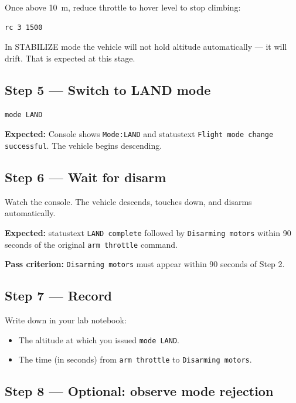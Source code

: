 \documentclass[a4paper,11pt,twoside]{article}
\begin{document}
Once above 10~m, reduce throttle to hover level to stop climbing:

\begin{Verbatim}[frame=single,fontsize=\small]
rc 3 1500
\end{Verbatim}

In STABILIZE mode the vehicle will not hold altitude automatically --- it will drift. That is expected at this stage.

\subsection*{Step 5 --- Switch to LAND mode}

\begin{Verbatim}[frame=single,fontsize=\small]
mode LAND
\end{Verbatim}

\textbf{Expected:} Console shows \texttt{Mode:LAND} and statustext \texttt{Flight mode change successful}. The vehicle begins descending.

\subsection*{Step 6 --- Wait for disarm}

Watch the console. The vehicle descends, touches down, and disarms automatically.

\textbf{Expected:} statustext \texttt{LAND complete} followed by \texttt{Disarming motors} within 90 seconds of the original \texttt{arm throttle} command.

\textbf{Pass criterion:} \texttt{Disarming motors} must appear within 90 seconds of Step 2.

\subsection*{Step 7 --- Record}

Write down in your lab notebook:
\begin{itemize}
  \item The altitude at which you issued \texttt{mode LAND}.
  \item The time (in seconds) from \texttt{arm throttle} to \texttt{Disarming motors}.
\end{itemize}

\subsection*{Step 8 --- Optional: observe mode rejection}
\end{document}
